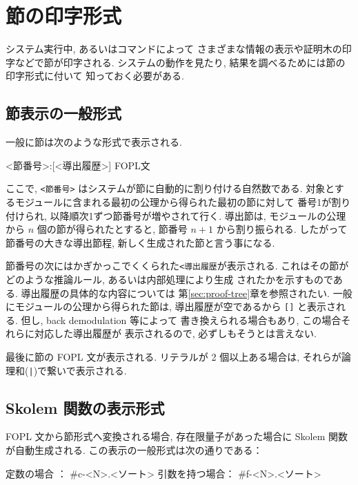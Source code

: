 \section{節の印字形式}
\label{sec:print-clause}
システム実行中, あるいはコマンドによって
さまざまな情報の表示や証明木の印字などで節が印字される.
システムの動作を見たり, 結果を調べるためには節の印字形式に付いて
知っておく必要がある.

\subsection{節表示の一般形式}

一般に節は次のような形式で表示される.

\begin{vvtm}
\begin{simplev}
    <節番号>:[<導出履歴>] FOPL文
\end{simplev}
\end{vvtm}

ここで, \texttt{<節番号>} はシステムが節に自動的に割り付ける自然数である.
対象とするモジュールに含まれる最初の公理から得られた最初の節に対して
番号1が割り付けられ, 以降順次1ずつ節番号が増やされて行く. 
導出節は, モジュールの公理から $n$ 個の節が得られたとすると,
節番号 $n+1$ から割り振られる. したがって節番号の大きな導出節程,
新しく生成された節と言う事になる.

節番号の次にはかぎかっこでくくられた\texttt{<導出履歴}が表示される.
これはその節がどのような推論ルール, あるいは内部処理により生成
されたかを示すものである. 導出履歴の具体的な内容については
第\ref{sec:proof-tree}章を参照されたい. 
一般にモジュールの公理から得られた節は, 導出履歴が空であるから
\texttt{[]} と表示される. 但し, back demodulation 等によって
書き換えられる場合もあり, この場合それらに対応した導出履歴が
表示されるので, 必ずしもそうとは言えない.

最後に節の FOPL 文が表示される. リテラルが 2 個以上ある場合は,
それらが論理和(\verb:|:)で繋いで表示される. 

\subsection{Skolem 関数の表示形式}

FOPL 文から節形式へ変換される場合, 存在限量子があった場合に
Skolem 関数が自動生成される. この表示の一般形式は次の通りである：

\begin{vvtm}
\begin{simplev}
  定数の場合    ： #c-<N>.<ソート>
  引数を持つ場合： #f-<N>.<ソート>
\end{simplev}
\end{vvtm}

